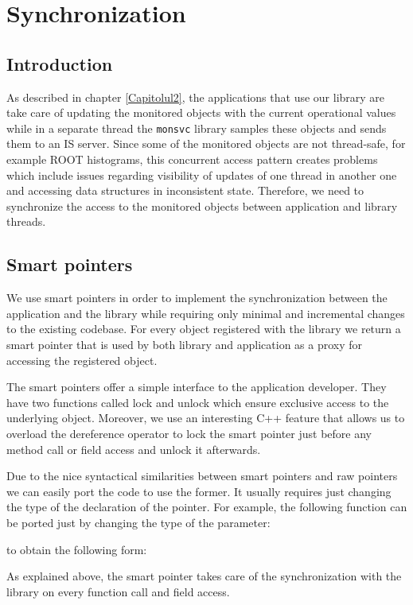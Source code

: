 \chapter{Synchronization} %
\label{Capitolul5}

\section{Introduction}

As described in chapter \ref{Capitolul2}, the applications that use our library are take care of updating the monitored objects with the current operational values while in a separate thread the {\tt monsvc} library samples these objects and sends them to an IS server. Since some of the monitored objects are not thread-safe, for example ROOT histograms, this concurrent access pattern creates problems which include issues regarding visibility of updates of one thread in another one and accessing data structures in inconsistent state. Therefore, we need to synchronize the access to the monitored objects between application and library threads.

\section{Smart pointers}

We use smart pointers in order to implement the synchronization between the application and the library while requiring only minimal and incremental changes to the existing codebase. For every object registered with the library we return a smart pointer that is used by both library and application as a proxy for accessing the registered object. 

The smart pointers offer a simple interface to the application developer. They have two functions called lock and unlock which ensure exclusive access to the underlying object. Moreover, we use an interesting C++ feature \citep{andrei2001modern} that allows us to overload the dereference operator to lock the smart pointer just before any method call or field access and unlock it afterwards.

Due to the nice syntactical similarities between smart pointers and raw pointers we can easily port the code to use the former. It usually requires just changing the type of the declaration of the pointer. For example, the following function can be ported just by changing the type of the parameter:

to obtain the following form:

As explained above, the smart pointer takes care of the synchronization with the library on every function call and field access.

